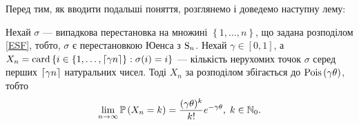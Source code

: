 Перед тим, як вводити подальші поняття, розглянемо і доведемо наступну лему:
\begin{lemma}\label{main_lemma}
    Нехай $\sigma$ --- випадкова перестановка на множині
    $\left\{1, \dots, n\right\}$, що задана розподілом \eqref{ESF},
    тобто, $\sigma$ є перестановкою Юенса з $\Sym{n}$.
    Нехай $\gamma \in [0, 1]$, а
    $X_n = \card\left\{i\in \left\{1,\dots,\ceil*{\gamma n} \right\} : \sigma(i) = i\right\}$
    --- кількість нерухомих точок
    $\sigma$ серед перших $\ceil*{\g n}$ натуральних чисел.
    Тоді $X_n$ за розподілом збігається до $\Poiss{\gamma\theta}$, тобто
    \begin{gather}
        \lim_{n\to\infty} \P{X_n = k} = \frac{(\gamma\theta)^k}{k!}e^{-\gamma\theta}, \; k \in \N_0.
    \end{gather} 
\end{lemma}
